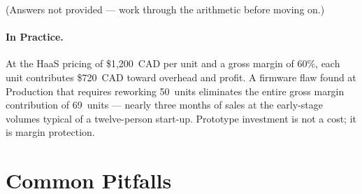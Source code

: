 \noindent(Answers not provided --- work through the arithmetic before moving on.)

\paragraph{In Practice.}
At the HaaS pricing of \$1{,}200~CAD per unit and a gross margin of 60\%, each
unit contributes \$720~CAD toward overhead and profit.
A firmware flaw found at Production that requires reworking 50~units
eliminates the entire gross margin contribution of 69~units --- nearly three
months of sales at the early-stage volumes typical of a twelve-person start-up.
Prototype investment is not a cost; it is margin protection.


\section*{Common Pitfalls}
\label{sec:ch3-pitfalls}

